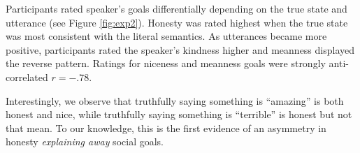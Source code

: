 \documentclass[10pt,letterpaper]{article}
\newcommand{\ndg}[1]{\textcolor{Green}{[ndg: #1]}}
\begin{document}


Participants rated speaker's goals differentially depending on the true state and utterance (see Figure \ref{fig:exp2}).
Honesty was rated highest when the true state was most consistent with the literal semantics. 
As utterances became more positive, participants rated the speaker's kindness higher and meanness displayed the reverse pattern. 
Ratings for niceness and meanness goals were strongly anti-correlated $r = -.78$.

Interestingly, we observe that truthfully saying something is ``amazing'' is both honest and nice, while 
truthfully saying something is ``terrible'' is honest but not that mean.
To our knowledge, this is the first evidence of an asymmetry in honesty \emph{explaining away} social goals.
\end{document}
